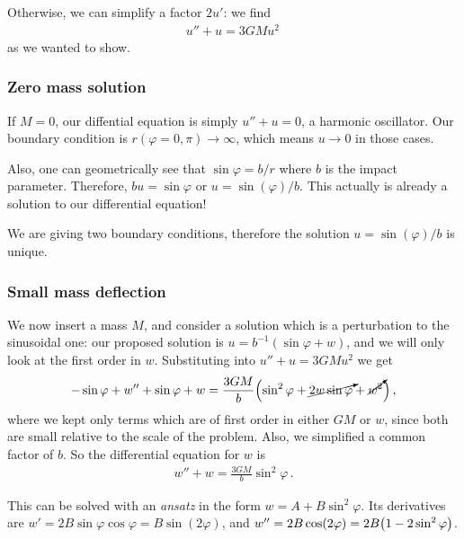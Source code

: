 \documentclass[main.tex]{subfiles}
\begin{document}
Otherwise, we can simplify a factor \(2 u'\): we find 
%
\begin{align}
  u'' + u = 3 GMu^2
\,
\end{align}
%
as we wanted to show. 

\subsubsection{Zero mass solution}

If \(M=0\), our diffential equation is simply \(u''+u=0\), a harmonic oscillator.
Our boundary condition is \(r (\varphi = 0, \pi ) \rightarrow \infty \), which means \(u \rightarrow 0\) in those cases. 

Also, one can geometrically see that \(\sin \varphi = b/r\) where \(b\) is the impact parameter.
Therefore, \(bu = \sin \varphi \) or \(u = \sin(\varphi ) / b \). This actually is already a solution to our differential equation! 

We are giving two boundary conditions, therefore the solution \(u = \sin(\varphi ) / b \) is unique. 

\subsubsection{Small mass deflection}

We now insert a mass \(M\), and consider a solution which is a perturbation to the sinusoidal one: our proposed solution is \(u = b^{-1} (\sin \varphi + w)\), and we will only look at the first order in \(w\). Substituting into \(u'' + u = 3GM u^2\) we get 
%
\begin{align}
  - \sin \varphi + w'' + \sin \varphi + w = \frac{3GM}{b} \qty(\sin^2 \varphi + \cancelto{}{2w  \sin \varphi} + \cancelto{}{w^2})
\,,
\end{align}
%
where we kept only terms which are of first order in either \(GM\) or \(w\), since both are small relative to the scale of the problem. Also, we simplified a common factor of \(b\).
So the differential equation for \(w\) is 
%
\begin{align}
  w'' + w = \frac{3GM}{b} \sin^2 \varphi 
\,.
\end{align}

This can be solved with an \emph{ansatz} in the form \(w = A + B \sin^2\varphi\).
Its derivatives are \(w' = 2B \sin \varphi \cos \varphi = B \sin(2\varphi )\), and \(w'' = 2B \cos(2 \varphi )= 2 B \qty(1 - 2\sin^2\varphi )\). 
\end{document}
